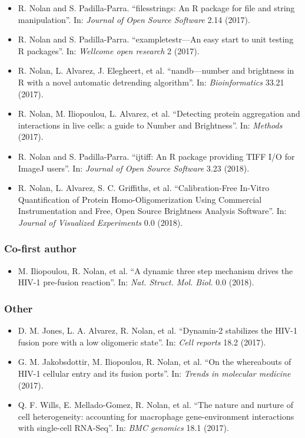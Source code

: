 \documentclass[12pt,]{book}
\providecommand{\tightlist}{%
  \setlength{\itemsep}{0pt}\setlength{\parskip}{0pt}}
\theoremstyle{definition}
\theoremstyle{definition}
\theoremstyle{definition}
\theoremstyle{remark}
\begin{document}
\begin{itemize}
\tightlist
\item
  R. Nolan and S. Padilla-Parra. ``filesstrings: An R package for file
  and string manipulation''. In: \emph{Journal of Open Source Software}
  2.14 (2017).
\item
  R. Nolan and S. Padilla-Parra. ``exampletestr---An easy start to unit
  testing R packages''. In: \emph{Wellcome open research} 2 (2017).
\item
  R. Nolan, L. Alvarez, J. Elegheert, et al. ``nandb---number and
  brightness in R with a novel automatic detrending algorithm''. In:
  \emph{Bioinformatics} 33.21 (2017).
\item
  R. Nolan, M. Iliopoulou, L. Alvarez, et al. ``Detecting protein
  aggregation and interactions in live cells: a guide to Number and
  Brightness''. In: \emph{Methods} (2017).
\item
  R. Nolan and S. Padilla-Parra. ``ijtiff: An R package providing TIFF
  I/O for ImageJ users''. In: \emph{Journal of Open Source Software}
  3.23 (2018).
\item
  R. Nolan, L. Alvarez, S. C. Griffiths, et al. ``Calibration-Free
  In-Vitro Quantification of Protein Homo-Oligomerization Using
  Commercial Instrumentation and Free, Open Source Brightness Analysis
  Software''. In: \emph{Journal of Visualized Experiments} 0.0 (2018).
\end{itemize}

\subsubsection*{Co-first author}\label{co-first-author}

\begin{itemize}
\tightlist
\item
  M. Iliopoulou, R. Nolan, et al. ``A dynamic three step mechanism
  drives the HIV-1 pre-fusion reaction''. In: \emph{Nat. Struct. Mol.
  Biol.} 0.0 (2018).
\end{itemize}

\subsubsection*{Other}\label{other}

\begin{itemize}
\tightlist
\item
  D. M. Jones, L. A. Alvarez, R. Nolan, et al. ``Dynamin-2 stabilizes
  the HIV-1 fusion pore with a low oligomeric state''. In: \emph{Cell
  reports} 18.2 (2017).
\item
  G. M. Jakobsdottir, M. Iliopoulou, R. Nolan, et al. ``On the
  whereabouts of HIV-1 cellular entry and its fusion ports''. In:
  \emph{Trends in molecular medicine} (2017).
\item
  Q. F. Wills, E. Mellado-Gomez, R. Nolan, et al. ``The nature and
  nurture of cell heterogeneity: accounting for macrophage
  gene-environment interactions with single-cell RNA-Seq''. In:
  \emph{BMC genomics} 18.1 (2017).
\end{itemize}
\end{document}

